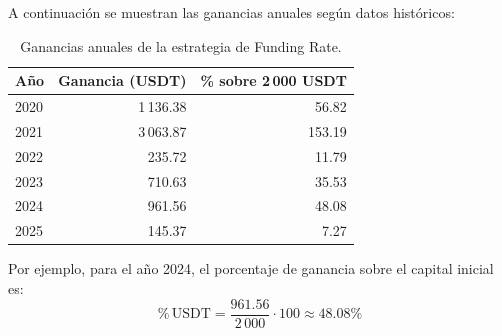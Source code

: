 \documentclass[../main.tex]{subfiles}
\begin{document}
A continuación se muestran las ganancias anuales según datos históricos:

\begin{table}[htbp]
    \centering
    \begin{tabular}{|l|r|r|}
        \hline
        \textbf{Año} & \textbf{Ganancia (USDT)} & \textbf{\% sobre 2\,000 USDT} \\
        \hline
        2020 & 1\,136.38 & 56.82 \\
        2021 & 3\,063.87 & 153.19 \\
        2022 & 235.72  & 11.79 \\
        2023 & 710.63  & 35.53 \\
        2024 & 961.56  & 48.08 \\
        2025 & 145.37  & 7.27  \\
        \hline
    \end{tabular}
    \caption{Ganancias anuales de la estrategia de Funding Rate.}
    \label{tab:funding_rates_percent}
\end{table}

Por ejemplo, para el año 2024, el porcentaje de ganancia sobre el capital inicial es:
\[
\%\,\text{USDT} = \frac{961.56}{2\,000} \cdot 100 \approx 48.08\%
\]
\end{document}

